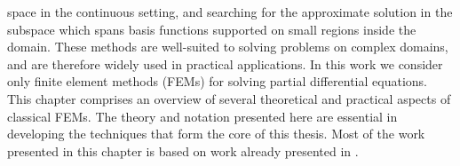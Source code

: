 space in the continuous setting, and searching for the approximate solution in the
subspace which spans basis functions supported on small regions inside the domain.
These methods are well-suited to solving problems on complex domains, and are
therefore widely used in practical applications.
In this work we consider only finite element methods (FEMs) for solving partial
differential equations.
This chapter comprises an overview of several theoretical and practical aspects of classical FEMs. The theory and notation presented here are essential in developing
the techniques that form the core of this thesis. Most of the work presented in this chapter is based on work already presented in \citet{arthursthesis,asnerthesis,bernabeusthesis,burman2007unified}.
%
